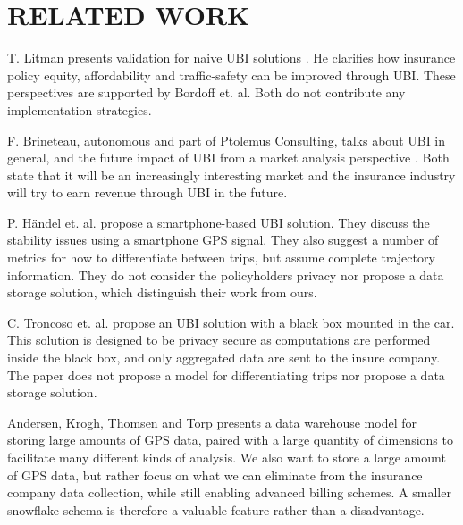\section{RELATED WORK}\label{sec:relwork}

T. Litman presents validation for naive UBI solutions\cite{art:PAYDVehInsur}\cite{art:vehicfeacosben}\cite{art:PAYDafford} . He clarifies how insurance policy equity, affordability and traffic-safety can be improved through UBI. These perspectives are supported by Bordoff et. al\cite{art:PAYDredharms}. Both do not contribute any implementation strategies.

F. Brineteau, autonomous and part of Ptolemus Consulting, talks about UBI in general, and the future impact of UBI from a market analysis perspective \cite{art:telematicsmatter}\cite{mar:telematics12}\cite{mar:ubi13}\cite{mar:ubi16}. Both state that it will be an increasingly interesting market and the insurance industry will try to earn revenue through UBI in the future.

P. Händel et. al. propose a smartphone-based UBI solution\cite{art:insurtelematics}\cite{art:smartphonemonitor}. They discuss the stability issues using a smartphone GPS signal. They also suggest a number of metrics for how to differentiate between trips, but assume complete trajectory information. They do not consider the policyholders privacy nor propose a data storage solution, which distinguish their work from ours.

C. Troncoso et. al. propose an UBI solution with a black box mounted in the car\cite{art:PriPAYDprivacy}. This solution is designed to be privacy secure as computations are performed inside the black box, and only aggregated data are sent to the insure company. The paper does not propose a model for differentiating trips nor propose a data storage solution.

Andersen, Krogh, Thomsen and Torp presents a data warehouse model for storing large amounts of GPS data, paired with a large quantity of dimensions to facilitate many different kinds of analysis\cite{art:gpswarehouse}. We also want to store a large amount of GPS data, but rather focus on what we can eliminate from the insurance company data collection, while still enabling advanced billing schemes. A smaller snowflake schema is therefore a valuable feature rather than a disadvantage.


